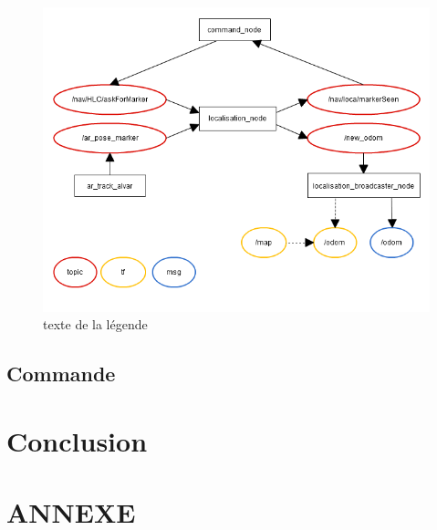 \documentclass[10pt,a4paper]{article}
\begin{document}
\begin{figure}
\center
\includegraphics[scale=0.6]{figures/rqt_loca.png} 
\caption{texte de la légende}	
\end{figure}


\subsection{Commande}
\label{sec:commande}


\newpage
\section{Conclusion}
\label{sec:conclusion}

\newpage
\listoffigures
\newpage

\section*{ANNEXE}
\end{document}
